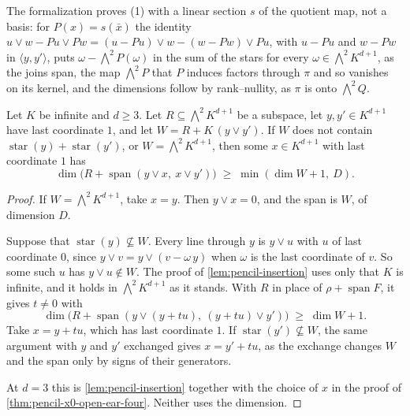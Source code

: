 \begin{fmlnote}
  The formalization proves (1) with a linear section $s$ of the quotient
  map, not a basis: for $P(x) = s(\bar x)$ the identity
  $u \vee w - Pu \vee Pw = (u - Pu) \vee w - (w - Pw) \vee Pu$, with
  $u - Pu$ and $w - Pw$ in $\langle y, y' \rangle$, puts
  $\omega - \bigwedge^2 P(\omega)$ in the sum of the stars for every
  $\omega \in \bigwedge^2 K^{d+1}$, as the joins span, the map
  $\bigwedge^2 P$ that $P$ induces factors through $\pi$ and so vanishes
  on its kernel, and the dimensions follow by rank--nullity, as $\pi$ is
  onto $\bigwedge^2 Q$.
\end{fmlnote}

\begin{lemma}
  \label{lem:pencil-d-insertion}
  \leanok
  Let $K$ be infinite and $d \ge 3$. Let $R \subseteq \bigwedge^2 K^{d+1}$
  be a subspace, let $y, y' \in K^{d+1}$ have last coordinate $1$, and
  let $W = R + K\,(y \vee y')$. If $W$ does not contain
  $\operatorname{star}(y) + \operatorname{star}(y')$, or
  $W = \bigwedge^2 K^{d+1}$, then some $x \in K^{d+1}$ with last
  coordinate $1$ has
  \[
    \dim\bigl(R + \operatorname{span}(y \vee x,\ x \vee y')\bigr)
    \;\ge\; \min(\dim W + 1,\ D).
  \]
\end{lemma}
\begin{proof}
  \leanok
  If $W = \bigwedge^2 K^{d+1}$, take $x = y$. Then $y \vee x = 0$, and
  the span is $W$, of dimension $D$.

  Suppose that $\operatorname{star}(y) \not\subseteq W$. Every line
  through $y$ is $y \vee u$ with $u$ of last coordinate $0$, since
  $y \vee v = y \vee (v - \omega\, y)$ when $\omega$ is the last
  coordinate of $v$. So some such $u$ has $y \vee u \notin W$. The proof
  of \cref{lem:pencil-insertion} uses only that $K$ is infinite, and it
  holds in $\bigwedge^2 K^{d+1}$ as it stands. With $R$ in place of
  $\rho + \operatorname{span} F$, it gives $t \neq 0$ with
  \[
    \dim\bigl(R + \operatorname{span}(y \vee (y + tu),\
    (y + tu) \vee y')\bigr) \;\ge\; \dim W + 1.
  \]
  Take $x = y + tu$, which has last coordinate $1$. If
  $\operatorname{star}(y') \not\subseteq W$, the same argument with $y$
  and $y'$ exchanged gives $x = y' + tu$, as the exchange changes $W$
  and the span only by signs of their generators.

  At $d = 3$ this is \cref{lem:pencil-insertion} together with the choice
  of $x$ in the proof of \cref{thm:pencil-x0-open-ear-four}. Neither uses
  the dimension.
\end{proof}

